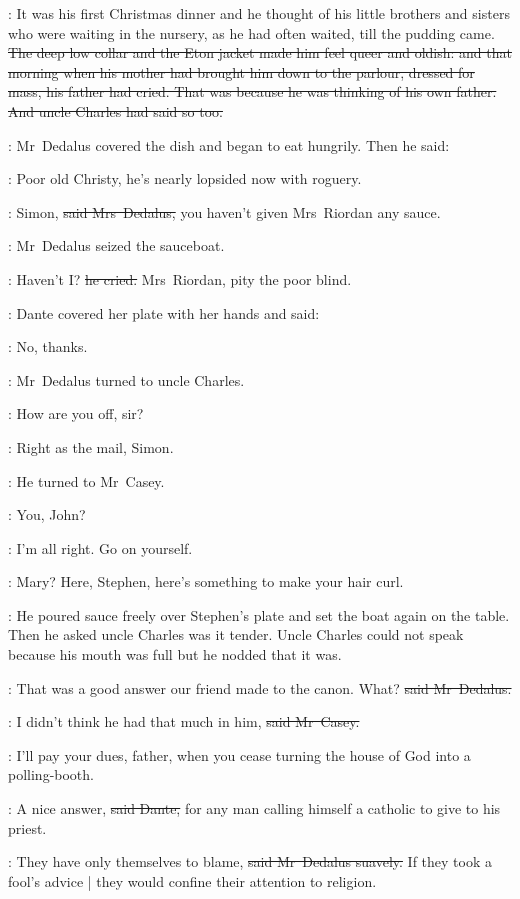 :
It was his first Christmas dinner
and he thought of his little brothers and sisters
who were waiting in the nursery,
as he had often waited,
till the pudding came.
\sout{The deep low collar and the Eton jacket
made him feel queer and oldish:
and that morning
when his mother had brought him down to the parlour,
dressed for mass,
his father had cried.
That was because he was thinking of his own father.
And uncle Charles had said so too.}

:
Mr~Dedalus covered the dish
and began to eat hungrily.
Then he said:

\simon:
Poor old Christy,
he’s nearly lopsided now with roguery.

\marydedalus:
Simon,
\sout{said Mrs~Dedalus,}
you haven’t given Mrs~Riordan any sauce.

:
Mr~Dedalus seized the sauceboat.

\simon:
Haven’t I?
\sout{he cried.}
Mrs~Riordan,
pity the poor blind.

:
Dante covered her plate with her hands and said:

\dante:
No, thanks.

:
Mr~Dedalus turned to uncle Charles.

\simon:
How are you off, sir?

\charles:
Right as the mail, Simon.

:
He turned to Mr~Casey.

\simon:
You, John?

\casey:
I’m all right.
Go on yourself.

\simon:
Mary?
Here, Stephen,
here’s something to make your hair curl.

:
He poured sauce freely over Stephen’s plate
and set the boat again on the table.
Then he asked uncle Charles was it tender.
Uncle Charles could not speak
because his mouth was full
but he nodded that it was.

\simon:
That was a good answer
our friend made to the canon.
What?
\sout{said Mr~Dedalus.}

\casey:
I didn’t think he had that much in him,
\sout{said Mr~Casey.}

\casey:
\stage{[as parishioner]}
I’ll pay your dues,
father,
when you cease turning the house of God into a polling-booth.

\dante:
A nice answer,
\sout{said Dante,}
for any man calling himself a catholic to give to his priest.

\simon:
They have only themselves to blame,
\sout{said Mr~Dedalus suavely.}
If they took a fool’s advice |
they would confine their attention to religion.

